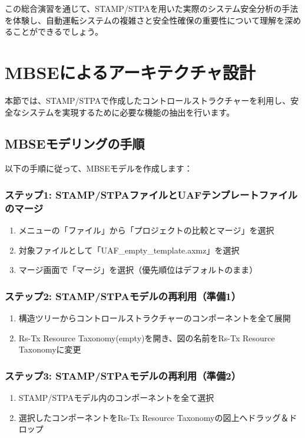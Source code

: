 この総合演習を通じて、STAMP/STPAを用いた実際のシステム安全分析の手法を体験し、自動運転システムの複雑さと安全性確保の重要性について理解を深めることができるでしょう。

\section{MBSEによるアーキテクチャ設計}

本節では、STAMP/STPAで作成したコントロールストラクチャーを利用し、安全なシステムを実現するために必要な機能の抽出を行います。

\subsection{MBSEモデリングの手順}

以下の手順に従って、MBSEモデルを作成します：

\subsubsection{ステップ1: STAMP/STPAファイルとUAFテンプレートファイルのマージ}
\begin{enumerate}
    \item メニューの「ファイル」から「プロジェクトの比較とマージ」を選択
    \item 対象ファイルとして「UAF\_empty\_template.axmz」を選択
    \item マージ画面で「マージ」を選択（優先順位はデフォルトのまま）
\end{enumerate}

\subsubsection{ステップ2: STAMP/STPAモデルの再利用（準備1）}
\begin{enumerate}
    \item 構造ツリーからコントロールストラクチャーのコンポーネントを全て展開
    \item Rs-Tx Resource Taxonomy(empty)を開き、図の名前をRs-Tx Resource Taxonomyに変更
\end{enumerate}

\subsubsection{ステップ3: STAMP/STPAモデルの再利用（準備2）}
\begin{enumerate}
    \item STAMP/STPAモデル内のコンポーネントを全て選択
    \item 選択したコンポーネントをRs-Tx Resource Taxonomyの図上へドラッグ＆ドロップ
\end{enumerate}

